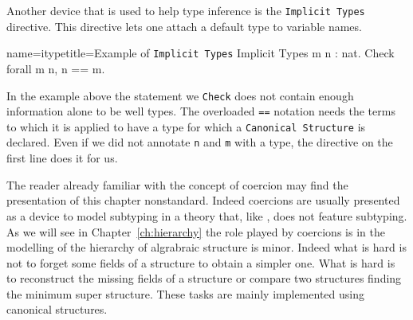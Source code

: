 Another device that is used to help type inference is the
\lstinline/Implicit Types/ directive.  This directive lets
one attach a default type to variable names.

\begin{coq}{name=itype}{title=Example of \lstinline/Implicit Types/}
Implicit Types m n : nat.
Check forall m n, n == m.
\end{coq}

In the example above the statement we \lstinline/Check/ does not
contain enough information alone to be well types.  The overloaded
\lstinline/==/ notation needs the terms to which it is applied to
have a type for which a \lstinline/Canonical Structure/ is declared.
Even if we did not annotate \lstinline/n/ and \lstinline/m/ with a
type, the directive on the first line does it for us.

The reader already familiar with the concept of coercion
may find the presentation of this chapter nonstandard.
Indeed coercions are usually presented as a device to model
subtyping in a theory that, like \mcbCIC{}, does not
feature subtyping.  As we will see in Chapter~\ref{ch:hierarchy}
the role played by coercions is in the modelling of the hierarchy
of algrabraic structure is minor.  Indeed what is hard is not to
forget some fields of a structure to obtain a simpler one.  What
is hard is to reconstruct the missing fields of a structure
or compare two structures finding the minimum super structure.
These tasks are mainly implemented using canonical structures.
